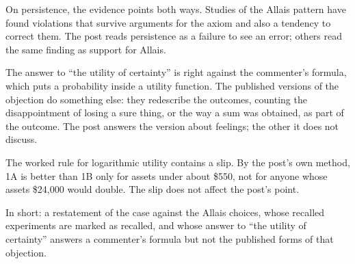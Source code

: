\begin{afterword}
On persistence, the evidence points both ways. Studies of the Allais pattern have found violations that survive arguments for the axiom and also a tendency to correct them. The post reads persistence as a failure to see an error; others read the same finding as support for Allais.

The answer to ``the utility of certainty'' is right against the commenter's formula, which puts a probability inside a utility function. The published versions of the objection do something else: they redescribe the outcomes, counting the disappointment of losing a sure thing, or the way a sum was obtained, as part of the outcome. The post answers the version about feelings; the other it does not discuss.

The worked rule for logarithmic utility contains a slip. By the post's own method, 1A is better than 1B only for assets under about \$550, not for anyone whose assets \$24,000 would double. The slip does not affect the post's point.

In short: a restatement of the case against the Allais choices, whose recalled experiments are marked as recalled, and whose answer to ``the utility of certainty'' answers a commenter's formula but not the published forms of that objection.
\end{afterword}
